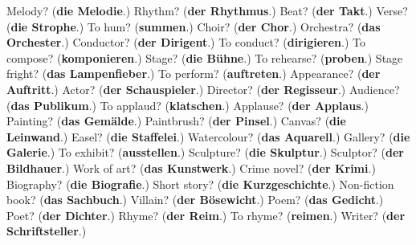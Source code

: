 \begin{tcolorbox}[breakable,colback=teal!4,colframe=teal!35!black,title={Before you move on}]
Melody? (\textbf{die Melodie}.) Rhythm? (\textbf{der Rhythmus}.) Beat? (\textbf{der Takt}.) Verse? (\textbf{die Strophe}.) To hum? (\textbf{summen}.) Choir? (\textbf{der Chor}.) Orchestra? (\textbf{das Orchester}.) Conductor? (\textbf{der Dirigent}.) To conduct? (\textbf{dirigieren}.) To compose? (\textbf{komponieren}.) Stage? (\textbf{die Bühne}.) To rehearse? (\textbf{proben}.) Stage fright? (\textbf{das Lampenfieber}.) To perform? (\textbf{auftreten}.) Appearance? (\textbf{der Auftritt}.) Actor? (\textbf{der Schauspieler}.) Director? (\textbf{der Regisseur}.) Audience? (\textbf{das Publikum}.) To applaud? (\textbf{klatschen}.) Applause? (\textbf{der Applaus}.) Painting? (\textbf{das Gemälde}.) Paintbrush? (\textbf{der Pinsel}.) Canvas? (\textbf{die Leinwand}.) Easel? (\textbf{die Staffelei}.) Watercolour? (\textbf{das Aquarell}.) Gallery? (\textbf{die Galerie}.) To exhibit? (\textbf{ausstellen}.) Sculpture? (\textbf{die Skulptur}.) Sculptor? (\textbf{der Bildhauer}.) Work of art? (\textbf{das Kunstwerk}.) Crime novel? (\textbf{der Krimi}.) Biography? (\textbf{die Biografie}.) Short story? (\textbf{die Kurzgeschichte}.) Non-fiction book? (\textbf{das Sachbuch}.) Villain? (\textbf{der Bösewicht}.) Poem? (\textbf{das Gedicht}.) Poet? (\textbf{der Dichter}.) Rhyme? (\textbf{der Reim}.) To rhyme? (\textbf{reimen}.) Writer? (\textbf{der Schriftsteller}.)
\end{tcolorbox}
